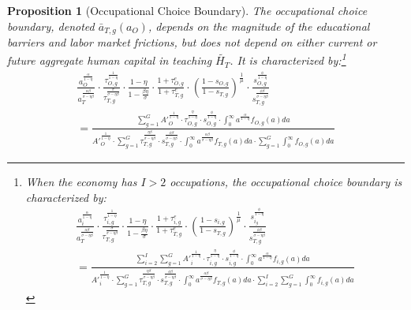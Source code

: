 \documentclass[onehalfspacing,11pt]{article}
\newtheorem{prp}{Proposition}
\begin{document}
	\begin{prp}[Occupational Choice Boundary] The occupational choice boundary, denoted $\bar{a}_{T,g}(a_O)$, depends on the magnitude of the educational barriers and labor market frictions, but does not depend on either current or future aggregate human capital in teaching $\widetilde{H_T}$. It is characterized by:\footnote{When the economy has $I>2$ occupations, the occupational choice boundary is characterized by:
			\begin{align*}
				\frac{a_i^{\frac{\alpha}{1-\eta}}}{a_T^{\frac{\alpha\beta}{\sigma-\eta\beta}}} \cdot \frac{\tau_{i,g}^\frac{1}{1-\eta}}{\tau_{T,g}^\frac{\sigma}{\sigma-\eta\beta}} \cdot \frac{1-\eta}{1-\tfrac{\beta \eta}{\sigma}} \cdot \frac{1+\tau^e_{i,g}}{1+\tau^e_{T,g}} \cdot \left(\frac{1-s_{i,g}}{1-s_{T,g}}\right)^\frac{1}{\mu} \cdot \frac{s_{i_g}^\frac{\phi}{1-\eta}}{s_{T,g}^\frac{\phi\beta}{\sigma-\eta\beta}} \nonumber\\
				= \frac{\sum_{i=2}^I \sum_{g=1}^G {A'}_i^\frac{1}{1-\eta} \cdot \tau_{i,g}^\frac{\eta}{1-\eta} \cdot s_{i,g}^{\frac{\phi}{1-\eta}} \cdot \int_0^\infty a^{\frac{\alpha}{1-\eta}} f_{i,g}(a)da }{{A'}_i^\frac{1}{1-\eta} \cdot \sum_{g=1}^G \tau_{T,g}^\frac{\eta\beta}{\sigma-\eta\beta} \cdot s_{T,g}^\frac{\phi\beta}{\sigma-\eta\beta} \cdot \int_0^\infty a^{\frac{\alpha\beta}{\sigma-\eta\beta}} f_{T,g}(a)da \cdot \sum_{i=2}^I \sum_{g=1}^G \int_0^\infty f_{i,g}(a)da  } 
			\end{align*}
		}
		\begin{align}
			\label{eq:occChoice}
			\frac{a_O^{\frac{\alpha}{1-\eta}}}{a_T^{\frac{\alpha\beta}{\sigma-\eta\beta}}} \cdot \frac{\tau_{O,g}^\frac{1}{1-\eta}}{\tau_{T,g}^\frac{\sigma}{\sigma-\eta\beta}} \cdot \frac{1-\eta}{1-\tfrac{\beta \eta}{\sigma}} \cdot \frac{1+\tau^e_{O,g}}{1+\tau^e_{T,g}} \cdot \left(\frac{1-s_{O,g}}{1-s_{T,g}}\right)^\frac{1}{\mu} \cdot \frac{s_{O,g}^\frac{\phi}{1-\eta}}{s_{T,g}^\frac{\phi\beta}{\sigma-\eta\beta}} \nonumber\\
			= \frac{\sum_{g=1}^G {A'}_O^{\frac{1}{1-\eta}} \cdot \tau_{O,g}^\frac{\eta}{1-\eta} \cdot s_{O,g}^{\frac{\phi}{1-\eta}} \cdot \int_0^\infty a^{\frac{\alpha}{1-\eta}} f_{O,g}(a)da }{{A'}_O^\frac{1}{1-\eta} \cdot \sum_{g=1}^G \tau_{T,g}^\frac{\eta\beta}{\sigma-\eta\beta} \cdot s_{T,g}^\frac{\phi\beta}{\sigma-\eta\beta} \cdot \int_0^\infty a^{\frac{\alpha\beta}{\sigma-\eta\beta}} f_{T,g}(a)da \cdot \sum_{g=1}^G \int_0^\infty f_{O,g}(a)da  } 
		\end{align}
	\end{prp}
	
\end{document}

